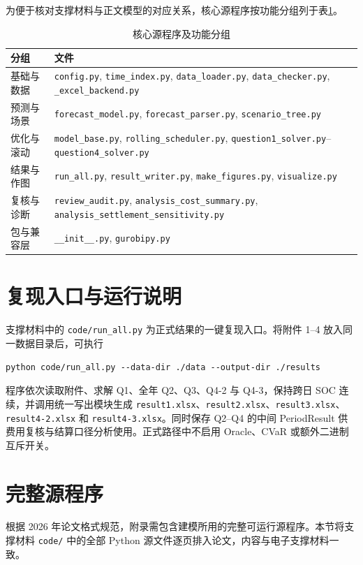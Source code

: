 \documentclass[withoutpreface]{cumcmthesis}
\begin{document}
为便于核对支撑材料与正文模型的对应关系，核心源程序按功能分组列于表\ref{tab:codefiles}。
\begin{table}[H]
\centering
\caption{核心源程序及功能分组}
\label{tab:codefiles}
\small
\begin{tabularx}{\textwidth}{>{\centering\arraybackslash}p{2.6cm} X}
\toprule
分组 & 文件\\
\midrule
基础与数据 & \texttt{config.py}, \texttt{time\_index.py}, \texttt{data\_loader.py}, \texttt{data\_checker.py}, \texttt{\_excel\_backend.py}\\
预测与场景 & \texttt{forecast\_model.py}, \texttt{forecast\_parser.py}, \texttt{scenario\_tree.py}\\
优化与滚动 & \texttt{model\_base.py}, \texttt{rolling\_scheduler.py}, \texttt{question1\_solver.py}--\texttt{question4\_solver.py}\\
结果与作图 & \texttt{run\_all.py}, \texttt{result\_writer.py}, \texttt{make\_figures.py}, \texttt{visualize.py}\\
复核与诊断 & \texttt{review\_audit.py}, \texttt{analysis\_cost\_summary.py}, \texttt{analysis\_settlement\_sensitivity.py}\\
包与兼容层 & \texttt{\_\_init\_\_.py}, \texttt{gurobipy.py}\\
\bottomrule
\end{tabularx}
\end{table}

\section{复现入口与运行说明}
支撑材料中的 \texttt{code/run\_all.py} 为正式结果的一键复现入口。将附件 1--4 放入同一数据目录后，可执行
\begin{verbatim}
python code/run_all.py --data-dir ./data --output-dir ./results
\end{verbatim}
程序依次读取附件、求解 Q1、全年 Q2、Q3、Q4-2 与 Q4-3，保持跨日 SOC 连续，并调用统一写出模块生成 \texttt{result1.xlsx}、\texttt{result2.xlsx}、\texttt{result3.xlsx}、\texttt{result4-2.xlsx} 和 \texttt{result4-3.xlsx}。同时保存 Q2--Q4 的中间 PeriodResult 供费用复核与结算口径分析使用。正式路径中不启用 Oracle、CVaR 或额外二进制互斥开关。

\section{完整源程序}
根据 2026 年论文格式规范，附录需包含建模所用的完整可运行源程序。本节将支撑材料 \texttt{code/} 中的全部 Python 源文件逐页排入论文，内容与电子支撑材料一致。


\end{document}
